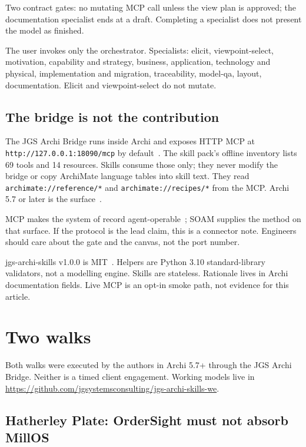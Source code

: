 \documentclass[10pt,journal,compsoc]{IEEEtran}
\begin{document}
Two contract gates: no mutating MCP call unless the view plan is approved; the documentation specialist ends at a draft. Completing a specialist does not present the model as finished.

The user invokes only the orchestrator. Specialists: elicit, viewpoint-select, motivation, capability and strategy, business, application, technology and physical, implementation and migration, traceability, model-qa, layout, documentation. Elicit and viewpoint-select do not mutate.

\subsection{The bridge is not the contribution}

The JGS Archi Bridge runs inside Archi and exposes HTTP MCP at \texttt{http://127.0.0.1:18090/mcp} by default~\cite{mcp2025,jgsarchibridge}. The skill pack's offline inventory lists 69 tools and 14 resources. Skills consume those only; they never modify the bridge or copy ArchiMate language tables into skill text. They read \texttt{archimate://reference/*} and \texttt{archimate://recipes/*} from the MCP. Archi 5.7 or later is the surface~\cite{archi,jgsarchiskills}.

MCP makes the system of record agent-operable~\cite{mcp2025}; SOAM supplies the method on that surface. If the protocol is the lead claim, this is a connector note. Engineers should care about the gate and the canvas, not the port number.

jgs-archi-skills v1.0.0 is MIT~\cite{jgsarchiskills}. Helpers are Python 3.10 standard-library validators, not a modelling engine. Skills are stateless. Rationale lives in Archi documentation fields. Live MCP is an opt-in smoke path, not evidence for this article.

\section{Two walks}

Both walks were executed by the authors in Archi 5.7+ through the JGS Archi Bridge. Neither is a timed client engagement. Working models live in \url{https://github.com/jgsystemsconsulting/jgs-archi-skills-we}.

\subsection{Hatherley Plate: OrderSight must not absorb MillOS}
\end{document}
